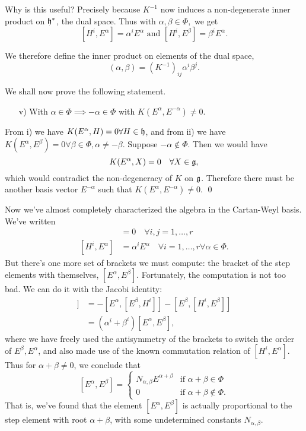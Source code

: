 Why is this useful? Precisely because $K^{-1}$ now induces a non-degenerate inner product on $\mathfrak{h}^*$, the dual space. Thus with $\alpha,\beta\in \Phi,$ we get
$$[H^i,E^\alpha]=\alpha^i E^\alpha\text{ and }[H^i,E^\beta]=\beta^i E^\alpha.$$
\begin{defn}
We therefore define the inner product on elements of the dual space,
$$(\alpha,\beta)=(K^{-1})_{ij}\alpha^i \beta^j.$$
\end{defn}

We shall now prove the following statement.
\begin{itemize}
\item[v)] With $\alpha\in \Phi\implies -\alpha\in \Phi$ with
$K(E^\alpha,E^{-\alpha})\neq 0.$
\end{itemize}
From i) we have $K(E^\alpha,H)=0\forall H\in \mathfrak{h}$, and from ii) we have $K(E^\alpha,E^\beta)=0 \forall \beta\in \Phi, \alpha\neq -\beta$. Suppose $-\alpha \notin \Phi$. Then we would have
$$K(E^\alpha,X)=0\quad \forall X\in \mathfrak{g},$$
which would contradict the non-degeneracy of $K$ on $\mathfrak{g}$. Therefore there must be another basis vector $E^{-\alpha}$ such that $K(E^\alpha,E^{-\alpha})\neq 0$. \qed

Now we've almost completely characterized the algebra in the Cartan-Weyl basis. We've written
\begin{align*}
[H^i,H^j]&=0 \quad\forall i,j=1,\ldots,r\\{}
[H^i,E^\alpha]&= \alpha^i E^\alpha \quad\forall i=1,\ldots,r \forall \alpha \in \Phi.
\end{align*}
But there's one more set of brackets we must compute: the bracket of the step elements with themselves, $[E^\alpha,E^\beta]$. Fortunately, the computation is not too bad. We can do it with the Jacobi identity:
\begin{align*}
[H^i,[E^\alpha,E^\beta]]&=-[E^\alpha,[E^\beta,H^i]]-[E^\beta,[H^i,E^\beta]]\\
&=(\alpha^i+\beta^i)[E^\alpha,E^\beta],
\end{align*}
where we have freely used the antisymmetry of the brackets to switch the order of $E^\beta,E^\alpha$, and also made use of the known commutation relation of $[H^i,E^\alpha]$. Thus for $\alpha+\beta \neq 0$, we conclude that
$$[E^\alpha,E^\beta]=\begin{cases}
N_{\alpha,\beta}E^{\alpha+\beta} & \text{if }\alpha+\beta\in \Phi\\
0 & \text{if }\alpha+\beta\not\in \Phi.
\end{cases}
$$
That is, we've found that the element $[E^\alpha,E^\beta]$ is actually proportional to the step element with root $\alpha+\beta$, with some undetermined constants $N_{\alpha,\beta}.$